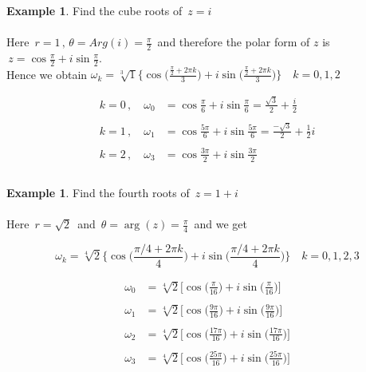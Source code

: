 \documentclass[11pt,a4paper]{article}
\theoremstyle{definition}
\newtheorem{example}[thm]{Example}
\begin{document}
\begin{example}
Find the cube roots of $\, z = i$\\

\text{\textcolor{red}{Solution}}\\
Here $\, r = 1\,,\, \theta = Arg(i) = \frac{\pi}{2}\,$ and therefore the polar form of $z$ is $\, z = \cos \frac{\pi}{2} + i \sin \frac{\pi}{2}$.\\

Hence we obtain
$\omega_k = \displaystyle{\sqrt[3]{1}\Bigg\{ \cos \Big(\frac{\frac{\pi}{2} + 2\pi k}{3}\Big) + i \sin \Big( \frac{\frac{\pi}{2} + 2\pi k}{3}\Big)\Bigg\}}\quad   k = 0, 1, 2$

\begin{align*}
k = 0\,, \quad  \omega_0 & = \cos \frac{\pi}{6} + i\sin \frac{\pi}{6} = \frac{\sqrt{3}}{2} + \frac{i}{2}\\\\
k = 1\,, \quad  \omega_1 & = \cos \frac{5\pi}{6} + i\sin \frac{5\pi}{6} = \frac{-\sqrt{3}}{2} + \frac{1}{2}i\\\\
k = 2\,, \quad  \omega_3 & = \cos \frac{3\pi}{2} + i\sin \frac{3\pi}{2}\\\\
\end{align*}
\end{example}

\begin{example}
Find the fourth roots of $\, z = 1 + i$\\  

\text{\textcolor{red}{Solution}}\\
Here $\, r = \sqrt{2}\,$ and $\, \theta = \operatorname{arg}(z) = \frac{\pi}{4}\,$ and we get 

$$\omega_k = \sqrt[4]{2}\Bigg\{ \cos \Big(\frac{\pi/4 + 2\pi k}{4}\Big) + i \sin \Big(\frac{\pi/4 + 2\pi k}{4}\Big)\Bigg\}\quad  k  = 0, 1, 2,3$$

\begin{align*}
\omega_0 & = \sqrt[4]{2} \Big[ \cos \Big(\frac{\pi}{16}\Big) + i\sin \Big(\frac{\pi}{16}\Big)\Big]\\\\
\omega_1 & = \sqrt[4]{2} \Big[ \cos \Big(\frac{9\pi}{16}\Big) + i\sin \Big(\frac{9\pi}{16}\Big)\Big]\\\\
\omega_2 & = \sqrt[4]{2} \Big[ \cos \Big(\frac{17\pi}{16}\Big) + i\sin \Big(\frac{17\pi}{16}\Big)\Big]\\\\
\omega_3 & = \sqrt[4]{2} \Big[ \cos \Big(\frac{25\pi}{16}\Big) + i\sin \Big(\frac{25\pi}{16}\Big)\Big]\\\\
\end{align*}
\end{example}
\end{document}
